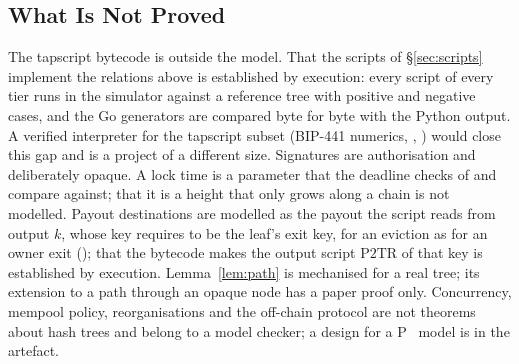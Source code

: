 \subsection{What Is Not Proved}\label{app:lean-not}

The tapscript bytecode is outside the model. That the scripts of
\S\ref{sec:scripts} implement the relations above is established by
execution: every script of every tier runs in the simulator against a
reference tree with positive and negative cases, and the Go generators are
compared byte for byte with the Python output. A verified interpreter for
the tapscript subset (BIP-441 numerics, , )
would close this gap and is a project of a different size. Signatures
are authorisation and deliberately opaque. A lock time is a parameter
that the deadline checks of  and  compare
against; that it is a height that only grows along a chain is not
modelled. Payout
destinations are modelled as the payout the script reads from output
$k$, whose key  requires to be the leaf's exit
key, for an eviction as for an owner exit ();
that the bytecode makes the output script $\mathrm{P2TR}$ of that key
is established by execution. Lemma~\ref{lem:path} is mechanised for a real tree;
its extension to a path through an opaque node has a paper proof only. Concurrency,
mempool policy, reorganisations and the off-chain protocol are not
theorems about hash trees and belong to a model checker; a design for a
P~\cite{plang} model is in the artefact.

